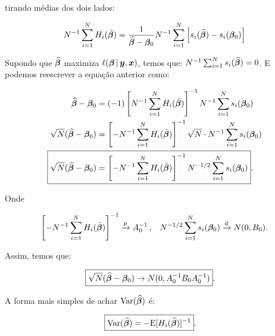\documentclass[11pt, oneside, a4paper, article]{article}
\numberwithin{equation}{section}
\begin{document}
\begin{description}
	\noindent
	tirando médias dos dois lados:

	\vspace{-1 em}
	\begin{align*}
		N^{-1} \sum_{i=1}^{N} 
		H_{i} ( \bar{\boldsymbol{\beta}} ) 
		=
		\frac{1}{\widehat{\boldsymbol{\beta}} - \boldsymbol{\beta}_{0}}
		N^{-1} \sum_{i=1}^{N} 
		\left[ 
			s_{i}( \widehat{\boldsymbol{\beta}} ) - s_{i}( \boldsymbol{\beta}_{0} )
		\right]
	\end{align*}

	Supondo que
	$\widehat{\boldsymbol{\beta}}$
	maximiza
	$\ell (\boldsymbol{\beta} \, | \, \boldsymbol{y}, \boldsymbol{x})$,
	temos que:
	$N^{-1} \sum_{i=1}^{N} s_{i}(\widehat{\boldsymbol{\beta}}) = 0$.
	E podemos reescrever a equação anterior como:

	\vspace{-1 em}
	\begin{align*}
		\widehat{\betavec} - \betavec_{0}
		&=
		(-1)
		\left[ N^{-1} \sum_{i=1}^{N} H_{i} ( \bar{\betavec} ) \right]^{-1}
		N^{-1} \sum_{i=1}^{N} s_{i}( \betavec_{0} ) 
		\\
		\sqrt{N} ( \widehat{\betavec} - \betavec_{0} )
		&=
		\left[
			- N^{-1} \sum_{i=1}^{N} H_{i} ( \bar{\betavec} )
		\right]^{-1}
		\sqrt{N} \cdot N^{-1} \sum_{i=1}^{N} s_{i}( \betavec_{0} ) 
		\\
		\Aboxed{
			\sqrt{N} ( \widehat{\betavec} - \betavec_{0} )
			&=
			\left[
				- N^{-1} \sum_{i=1}^{N} H_{i} ( \bar{\betavec} )
			\right]^{-1}
		N^{-1/2} \sum_{i=1}^{N} s_{i}( \betavec_{0} ) }.
	\end{align*}

	\noindent
	Onde

	\vspace{-1 em}
	\begin{align*}
		\left[ 
			- N^{-1} \sum_{i=1}^{N}
		H_{i} ( \bar{\boldsymbol{\beta}} ) \right]^{-1}
		\xrightarrow{p}
		A_{0}^{-1} \, ,
		&&
		N^{-1/2} \sum_{i=1}^{N} s_{i}( \boldsymbol{\beta}_{0} ) 
		\xrightarrow{d}
		N( 0, B_{0} ).
	\end{align*}

	\noindent
	Assim, temos que:

	\vspace{-1 em}
	\begin{align*}
		\Aboxed{
			\sqrt{N} ( \widehat{\betavec} - \betavec_{0} )
			\to
		N ( 0, A_{0}^{-1} B_{0} A_{0}^{-1} )}.
	\end{align*}

	A forma mais simples de achar $\text{Var} ( {\widehat{\boldsymbol{\beta}}} )$ é:

	\vspace{-1 em}
	\begin{align*}
		\Aboxed{
			\Var( \widehat{\betavec} )
			&=
		- \E[ H_{i} ( \widehat{\betavec} ) ]^{-1} }.
	\end{align*}


\end{description}
\end{document}
